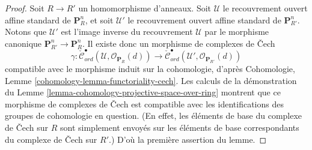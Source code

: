 \begin{proof}
Soit $R \to R'$ un homomorphisme d'anneaux.
Soit $\mathcal{U}$ le recouvrement ouvert affine standard de $\mathbf{P}^n_R$,
et soit $\mathcal{U}'$ le recouvrement ouvert affine standard de
$\mathbf{P}^n_{R'}$. Notons que $\mathcal{U}'$ est l'image inverse du recouvrement
$\mathcal{U}$ par le morphisme canonique
$\mathbf{P}^n_{R'} \to \mathbf{P}^n_R$. Il existe donc
un morphisme de complexes de {\v C}ech
$$
\gamma :
\check{\mathcal{C}}_{ord}^\bullet(\mathcal{U},
\mathcal{O}_{\mathbf{P}_R}(d))
\longrightarrow
\check{\mathcal{C}}_{ord}^\bullet(\mathcal{U}',
\mathcal{O}_{\mathbf{P}_{R'}}(d))
$$
compatible avec le morphisme induit sur la cohomologie, d'après
Cohomologie, Lemme \ref{cohomology-lemma-functoriality-cech}.
Les calculs de la démonstration du
Lemme \ref{lemma-cohomology-projective-space-over-ring}
montrent que ce morphisme de complexes de {\v C}ech est compatible avec les identifications
des groupes de cohomologie en question. (En effet, les éléments de base du
complexe de {\v C}ech sur $R$ sont simplement envoyés sur les éléments de base correspondants
du complexe de {\v C}ech sur $R'$.) D'où la première assertion du lemme.


\end{proof}
